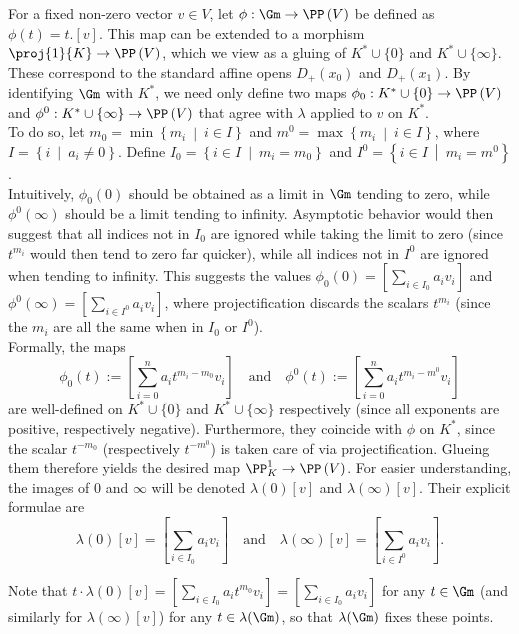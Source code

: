 For a fixed non-zero vector $v \in V$, let $\phi: \Gm \to \PP\left(V\right)$ be defined as $\phi(t) = t. [v]$. This map can be extended to a morphism $\proj{1}{K} \to \PP\left(V\right)$, which we view as a gluing of $K^* \cup \{0\}$ and $K^* \cup \{\infty\}$. These correspond to the standard affine opens $D_+(x_0)$ and $D_+(x_1)$. By identifying $\Gm$ with $K^*$, we need only define two maps $\phi_0 : K^* \cup \{0\} \to \PP\left(V\right)$ and $\phi^0 : K^* \cup \{\infty\} \to \PP\left(V\right)$ that agree with $\lambda$ applied to $v$ on $K^*$. \\
To do so, let $m_0 = \min{\left\{m_i ~\middle|~ i \in I\right\}}$ and $m^0 = \max{\left\{m_i ~\middle|~ i \in I\right\}}$, where $I = \left\{i ~\middle|~ a_i \neq 0\right\}$. Define $I_0 = \left\{ i \in I ~\middle|~ m_i = m_0\right\}$ and $I^0 = \left\{ i \in I ~\middle|~ m_i = m^0\right\}$.\\
Intuitively, $\phi_0(0)$ should be obtained as a limit in $\Gm$ tending to zero, while $\phi^0(\infty)$ should be a limit tending to infinity. Asymptotic behavior would then suggest that all indices not in $I_0$ are ignored while taking the limit to zero (since $t^{m_i}$ would then tend to zero far quicker), while all indices not in $I^0$ are ignored when tending to infinity. This suggests the values $\phi_0(0) = [\sum_{i \in I_0} a_i v_i]$ and ${\phi^0(\infty) = [\sum_{i \in I^0} a_i v_i]}$, where projectification discards the scalars $t^{m_i}$ (since the $m_i$ are all the same when in $I_0$ or $I^0$). \\
Formally, the maps 
\[\phi_0(t) := \left[\sum_{i=0}^{n} a_i t^{m_i - m_0} v_i\right] \quad \text{and} \quad \phi^0(t) := \left[\sum_{i=0}^{n} a_i t^{m_i - m^0} v_i\right]\]
are well-defined on $K^* \cup \{0\}$ and $K^* \cup \{\infty\}$ respectively (since all exponents are positive, respectively negative). Furthermore, they coincide with $\phi$ on $K^*$, since the scalar $t^{-m_0}$ (respectively $t^{-m^0}$) is taken care of via projectification. Glueing them therefore yields the desired map $\PP^1_K \to \PP\left(V\right)$. For easier understanding, the images of $0$ and $\infty$ will be denoted $\lambda(0)[v]$ and $\lambda(\infty)[v]$. Their explicit formulae are
\[ \lambda(0)[v] = \left[\sum_{i \in I_0} a_i v_i\right] \quad \text{and} \quad \lambda(\infty)[v] = \left[\sum_{i \in I^0} a_i v_i\right].\]

Note that $t \cdot \lambda(0)[v] = \left[\sum_{i \in I_0} a_i t^{m_0} v_i\right] = \left[\sum_{i \in I_0} a_i v_i\right]$ for any $t \in \Gm$ (and similarly for $\lambda(\infty)[v]$) for any $t \in \lambda(\Gm)$, so that $\lambda(\Gm)$ fixes these points.


